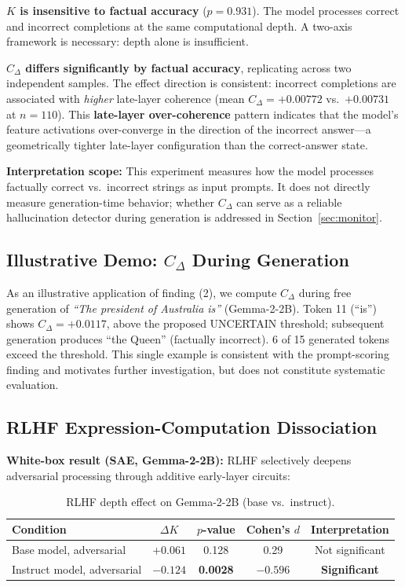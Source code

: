 \documentclass[10pt]{article}
\begin{document}
\textbf{$K$ is insensitive to factual accuracy} ($p = 0.931$). The model processes correct and incorrect completions at the same computational depth. A two-axis framework is necessary: depth alone is insufficient.

\textbf{$C_{\Delta}$ differs significantly by factual accuracy}, replicating across two independent samples. The effect direction is consistent: incorrect completions are associated with \textit{higher} late-layer coherence (mean $C_{\Delta} = +0.00772$ vs.\ $+0.00731$ at $n{=}110$). This \textbf{late-layer over-coherence} pattern indicates that the model's feature activations over-converge in the direction of the incorrect answer---a geometrically tighter late-layer configuration than the correct-answer state.

\textbf{Interpretation scope:} This experiment measures how the model processes factually correct vs.\ incorrect strings as input prompts. It does not directly measure generation-time behavior; whether $C_{\Delta}$ can serve as a reliable hallucination detector during generation is addressed in Section~\ref{sec:monitor}.

\subsection{Illustrative Demo: $C_{\Delta}$ During Generation}
\label{sec:demo}

As an illustrative application of finding (2), we compute $C_{\Delta}$ during free generation of \textit{``The president of Australia is''} (Gemma-2-2B). Token 11 (``is'') shows $C_{\Delta} = +0.0117$, above the proposed UNCERTAIN threshold; subsequent generation produces ``the Queen'' (factually incorrect). 6 of 15 generated tokens exceed the threshold. This single example is consistent with the prompt-scoring finding and motivates further investigation, but does not constitute systematic evaluation.

\subsection{RLHF Expression-Computation Dissociation}

\textbf{White-box result (SAE, Gemma-2-2B):}
RLHF selectively deepens adversarial processing through additive early-layer circuits:

\begin{table}[h]
\centering
\caption{RLHF depth effect on Gemma-2-2B (base vs.\ instruct).}
\begin{tabular}{lcccc}
\toprule
Condition & $\Delta K$ & $p$-value & Cohen's $d$ & Interpretation \\
\midrule
Base model, adversarial & $+0.061$ & 0.128 & 0.29 & Not significant \\
Instruct model, adversarial & $-0.124$ & \textbf{0.0028} & $-0.596$ & \textbf{Significant} \\
\bottomrule
\end{tabular}
\end{table}
\end{document}
